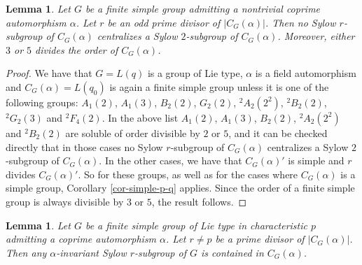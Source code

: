\documentclass[12pt]{amsart}
\newtheorem{lemma}[theorem]{\bf Lemma}
\newcommand{\al }{\alpha }
\newcommand{\elp}{p}
\DeclareMathOperator{\Sym}{Sym}
\DeclareMathOperator{\alt}{Alt}
\begin{document}
\begin{lemma}\label{cent-small}  Let $G$ be a finite simple group admitting a nontrivial 
 coprime automorphism $\alpha$. Let $r$ be an odd prime divisor of $|C_G(\alpha)|$. Then no Sylow $r$-subgroup of $C_G(\alpha)$ centralizes a Sylow $2$-subgroup of $C_G(\alpha)$. Moreover, either $3$ or $5$ divides the order of $C_G(\alpha)$.
\end{lemma}
\begin{proof} We have that $G = L(q)$ is a group of Lie type, $\alpha$ is a field automorphism and $C_G(\alpha) = L(q_0)$
is again a finite simple group unless it is one of the following groups:   $A_1(2)$, $A_1(3)$, $B_2(2)$, $G_2(2)$, $^2A_2(2^2)$, $^2B_2(2)$, $^2G_2(3)$ and $^2F_4(2)$. In the above list $A_1(2)$, $A_1(3)$, $B_2(2)$, $^2A_2(2^2)$ and $^2B_2(2)$ are soluble of order divisible by $2$ or $5$, and it can be checked directly that in those cases no  Sylow $r$-subgroup of $C_G(\alpha)$  centralizes a Sylow $2$-subgroup of $C_G(\alpha)$. In the other cases, we have that $C_G(\alpha)'$ is simple and $r$ divides $C_G(\alpha)'$. So for these groups, as well as for the cases where $C_G(\alpha)$ is a simple group, Corollary \ref{cor-simple-p-q} applies. Since the order of a finite simple group is always divisible by $3$ or $5$, the result follows.
\end{proof}



\begin{lemma}\label{lemma-simple-coprime} Let $G$ be  a  finite simple group of Lie type in characteristic $\elp$ admitting a coprime automorphism  $\alpha$. Let $r\ne\elp$ be a prime divisor of $|C_G(\al)|$.
Then any $\alpha$-invariant Sylow $r$-subgroup of $G$ is contained in $C_G(\alpha)$. 
\end{lemma}
\end{document}
